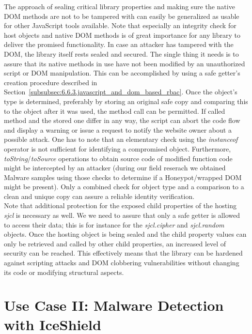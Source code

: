     The approach of sealing critical library properties and making sure the native DOM methods are not to be tampered with can easily be generalized as usable for other JavaScript tools available. Note that especially an integrity check for host objects and native DOM methods is of great importance for any library to deliver the promised functionality. In case an attacker has tampered with the DOM, the library itself rests sealed and secured. The single thing it needs is to assure that its native methods in use have not been modified by an unauthorized script or DOM manipulation. This can be accomplished by using a safe getter's creation procedure described in Section~\ref{subsubsec:6.6.3.javascript_and_dom_based_rbac}. Once the object's type is determined, preferably by storing an original safe copy and comparing this to the object after it was used, the method call can be permitted. If called method and the stored one differ in any way, the script can abort the code flow and display a warning or issue a request to notify the website owner about a possible attack. One has to note that an elementary check using the \textit{instanceof} operator is not sufficient for identifying a compromised object. Furthermore, \textit{toString}/\textit{toSource} operations to obtain source code of modified function code might be intercepted by an attacker (during our field reserach we obtained Malware samples using those checks to determine if a Honeypot/wrapped DOM might be present). Only a combined check for object type and a comparison to a clean and unique copy can assure a reliable identity verification.\\

    Note that additional protection for the exposed child properties of the hosting \textit{sjcl} is necessary as well. We we need to assure that only a safe getter is allowed to access their data; this is for instance for the \textit{sjcl.cipher} and \textit{sjcl.random} objects. Once the hosting object is being sealed and the child property values can only be retrieved and called by other child properties, an increased level of security can be reached. This effectively means that the library can be hardened against scripting attacks and DOM clobbering vulnerabilities without changing its code or modifying structural aspects.\\


  \section{Use Case II: Malware Detection with IceShield}
  \label{subsec:6.5.introducing_iceshield}

